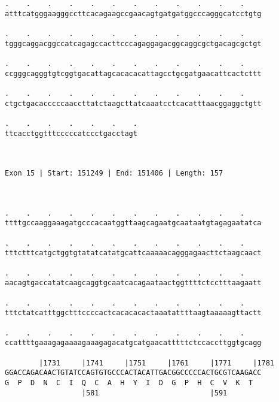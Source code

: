 \documentclass{article}
\begin{document}
\begin{Verbatim}
.    .    .    .    .    .    .    .    .    .    .    .    
atttcatgggaagggccttcacagaagccgaacagtgatgatggcccagggcatcctgtg
                                                            
.    .    .    .    .    .    .    .    .    .    .    .    
tgggcaggacggccatcagagccacttcccagaggagacggcaggcgctgacagcgctgt
                                                            
.    .    .    .    .    .    .    .    .    .    .    .    
ccgggcagggtgtcggtgacattagcacacacattagcctgcgatgaacattcactcttt
                                                            
.    .    .    .    .    .    .    .    .    .    .    .    
ctgctgacacccccaaccttatctaagcttatcaaatcctcacatttaacggaggctgtt
                                                            
.    .    .    .    .    .    .
ttcacctggtttcccccatccctgacctagt
                               
                               
 
Exon 15 | Start: 151249 | End: 151406 | Length: 157



.    .    .    .    .    .    .    .    .    .    .    .    
ttttgccaaggaaagatgcccacaatggttaagcagaatgcaataatgtagagaatatca
                                                            
.    .    .    .    .    .    .    .    .    .    .    .    
tttctttcatgctggtgtatatcatatgcattcaaaaacagggagaacttctaagcaact
                                                            
.    .    .    .    .    .    .    .    .    .    .    .    
aacagtgaccatatcaagcaggtgcaatcacagaataactggttttctcctttaagaatt
                                                            
.    .    .    .    .    .    .    .    .    .    .    .    
tttctatcatttggctttccccactcacacacactaaatattttaagtaaaaagttactt
                                                            
.    .    .    .    .    .    .    .    .    .    .    .    
ccattttgaaagagaaaagaaagagacatgcatgaacatttttctccaccttggtgcagg
                                                            
        |1731     |1741     |1751     |1761     |1771     |1781
GGACCAGACAACTGTATCCAGTGTGCCCACTACATTGACGGCCCCCACTGCGTCAAGACC
G  P  D  N  C  I  Q  C  A  H  Y  I  D  G  P  H  C  V  K  T  
                  |581                          |591        
  

\end{Verbatim}
\end{document}

